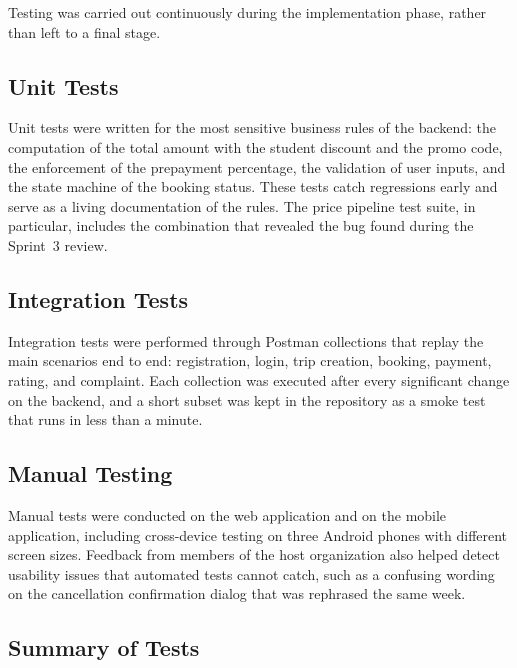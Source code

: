 Testing was carried out continuously during the implementation phase, rather than left to a final stage.

\subsection{Unit Tests}

Unit tests were written for the most sensitive business rules of the backend: the computation of the total amount with the student discount and the promo code, the enforcement of the prepayment percentage, the validation of user inputs, and the state machine of the booking status. These tests catch regressions early and serve as a living documentation of the rules. The price pipeline test suite, in particular, includes the combination that revealed the bug found during the Sprint~3 review.

\subsection{Integration Tests}

Integration tests were performed through Postman collections that replay the main scenarios end to end: registration, login, trip creation, booking, payment, rating, and complaint. Each collection was executed after every significant change on the backend, and a short subset was kept in the repository as a smoke test that runs in less than a minute.

\subsection{Manual Testing}

Manual tests were conducted on the web application and on the mobile application, including cross-device testing on three Android phones with different screen sizes. Feedback from members of the host organization also helped detect usability issues that automated tests cannot catch, such as a confusing wording on the cancellation confirmation dialog that was rephrased the same week.

\subsection{Summary of Tests}

